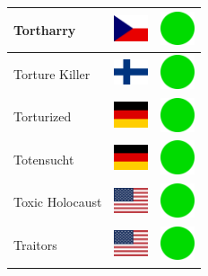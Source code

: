 \documentclass[12pt, a4paper, twoside]{report}
\begin{document}
\begin{center}
\begin{longtable}{|p{5cm}|p{2cm}|p{2cm}|}
 Tortharry                                                  & \includegraphics[width=1cm]{4x3/cz} &   \includegraphics[width=1cm]{likes/y} \\ \hline
 Torture Killer                                             & \includegraphics[width=1cm]{4x3/fi} &   \includegraphics[width=1cm]{likes/y} \\ \hline
 Torturized                                                 & \includegraphics[width=1cm]{4x3/de} &   \includegraphics[width=1cm]{likes/y} \\ \hline
 Totensucht                                                 & \includegraphics[width=1cm]{4x3/de} &   \includegraphics[width=1cm]{likes/y} \\ \hline
 Toxic Holocaust                                            & \includegraphics[width=1cm]{4x3/us} &   \includegraphics[width=1cm]{likes/y} \\ \hline
 Traitors                                                   & \includegraphics[width=1cm]{4x3/us} &   \includegraphics[width=1cm]{likes/y} \\ \hline

\end{longtable}
\end{center}
\end{document}
